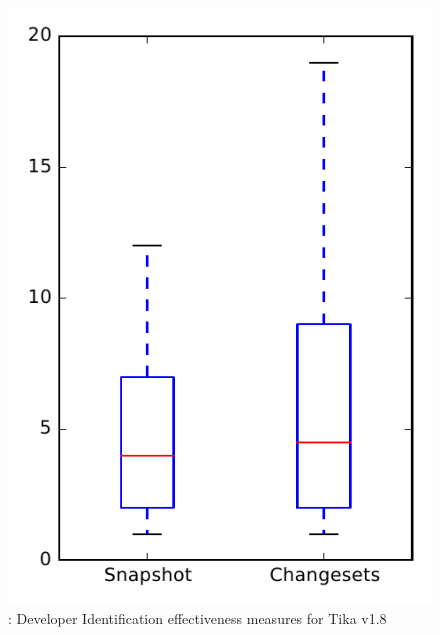 
\begin{figure}
\centering
\includegraphics[height=0.4\textheight]{figures/dit/rq1_tika_no_outlier}
\caption{\done: Developer Identification effectiveness measures for Tika v1.8}
\label{fig:dit:rq1:tika}
\end{figure}
